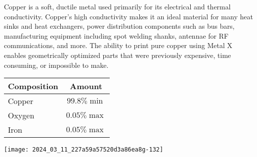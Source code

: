 \documentclass[10pt]{article}
\begin{document}
Copper is a soft, ductile metal used primarily for its electrical and thermal conductivity. Copper's high conductivity makes it an ideal material for many heat sinks and heat exchangers, power distribution components such as bus bars, manufacturing equipment including spot welding shanks, antennae for RF communications, and more. The ability to print pure copper using Metal $\mathrm{X}$ enables geometrically optimized parts that were previously expensive, time consuming, or impossible to make.

\begin{center}
\begin{tabular}{lc}
Composition & Amount \\
\hline
Copper & $99.8 \% \min$ \\
\hline
Oxygen & $0.05 \% \max$ \\
\hline
Iron & $0.05 \% \max$ \\
\hline
\end{tabular}
\end{center}

\begin{center}
\texttt{[image: 2024\_03\_11\_227a59a57520d3a86ea8g-132]}
\end{center}
\end{document}
